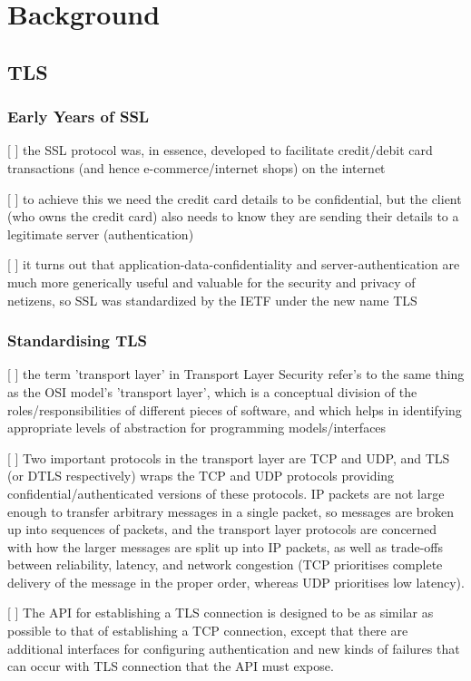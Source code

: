 \chapter{Background}

\section{TLS}
\subsection{Early Years of SSL}
[ ] the \ac{SSL}  protocol was, in essence, developed to facilitate credit/debit card transactions (and hence e-commerce/internet shops) on the internet

[ ] to achieve this we need the credit card details to be confidential, but the client (who owns the credit card) also needs to know they are sending their details to a legitimate server (authentication) 

[ ] it turns out that application-data-confidentiality and server-authentication are much more generically useful and valuable for the security and privacy of netizens, so \ac{SSL}  was standardized by the IETF under the new name TLS

\subsection{Standardising TLS}

[ ] the term 'transport layer' in Transport Layer Security refer's to the same thing as the OSI model's 'transport layer', which is a conceptual division of the roles/responsibilities of different pieces of software, and which helps in identifying appropriate levels of abstraction for programming models/interfaces

[ ] Two important protocols in the transport layer are TCP and UDP, and TLS (or DTLS respectively) wraps the TCP and UDP protocols providing confidential/authenticated versions of these protocols. IP packets are not large enough to transfer arbitrary messages in a single packet, so messages are broken up into sequences of packets, and the transport layer protocols are concerned with how the larger messages are split up into IP packets, as well as trade-offs between reliability, latency, and network congestion (TCP prioritises complete delivery of the message in the proper order, whereas UDP prioritises low latency).

[ ] The API for establishing a TLS connection is designed to be as similar as possible to that of establishing a TCP connection, except that there are additional interfaces for configuring authentication and new kinds of failures that can occur with TLS connection that the API must expose.

